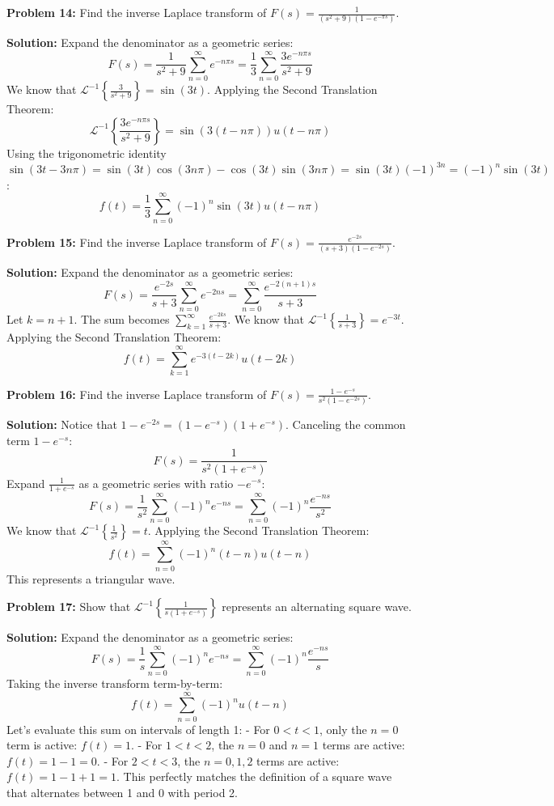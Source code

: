 \documentclass[11pt, letterpaper]{article}
\theoremstyle{definition}
\theoremstyle{remark}
\begin{document}
\vspace{1em}
\textbf{Problem 14:} Find the inverse Laplace transform of $F(s) = \frac{1}{(s^2 + 9)(1 - e^{-\pi s})}$.

\textbf{Solution:}
Expand the denominator as a geometric series:
\[ F(s) = \frac{1}{s^2 + 9} \sum_{n=0}^\infty e^{-n\pi s} = \frac{1}{3} \sum_{n=0}^\infty \frac{3 e^{-n\pi s}}{s^2 + 9} \]
We know that $\mathcal{L}^{-1} \left\{ \frac{3}{s^2 + 9} \right\} = \sin(3t)$. Applying the Second Translation Theorem:
\[ \mathcal{L}^{-1} \left\{ \frac{3 e^{-n\pi s}}{s^2 + 9} \right\} = \sin(3(t - n\pi)) u(t - n\pi) \]
Using the trigonometric identity $\sin(3t - 3n\pi) = \sin(3t)\cos(3n\pi) - \cos(3t)\sin(3n\pi) = \sin(3t)(-1)^{3n} = (-1)^n \sin(3t)$:
\[ f(t) = \frac{1}{3} \sum_{n=0}^\infty (-1)^n \sin(3t) u(t - n\pi) \]

\vspace{1em}
\textbf{Problem 15:} Find the inverse Laplace transform of $F(s) = \frac{e^{-2s}}{(s + 3)(1 - e^{-2s})}$.

\textbf{Solution:}
Expand the denominator as a geometric series:
\[ F(s) = \frac{e^{-2s}}{s + 3} \sum_{n=0}^\infty e^{-2ns} = \sum_{n=0}^\infty \frac{e^{-2(n+1)s}}{s + 3} \]
Let $k = n + 1$. The sum becomes $\sum_{k=1}^\infty \frac{e^{-2ks}}{s + 3}$.
We know that $\mathcal{L}^{-1} \left\{ \frac{1}{s + 3} \right\} = e^{-3t}$. Applying the Second Translation Theorem:
\[ f(t) = \sum_{k=1}^\infty e^{-3(t - 2k)} u(t - 2k) \]

\vspace{1em}
\textbf{Problem 16:} Find the inverse Laplace transform of $F(s) = \frac{1 - e^{-s}}{s^2(1 - e^{-2s})}$.

\textbf{Solution:}
Notice that $1 - e^{-2s} = (1 - e^{-s})(1 + e^{-s})$. Canceling the common term $1 - e^{-s}$:
\[ F(s) = \frac{1}{s^2(1 + e^{-s})} \]
Expand $\frac{1}{1 + e^{-s}}$ as a geometric series with ratio $-e^{-s}$:
\[ F(s) = \frac{1}{s^2} \sum_{n=0}^\infty (-1)^n e^{-ns} = \sum_{n=0}^\infty (-1)^n \frac{e^{-ns}}{s^2} \]
We know that $\mathcal{L}^{-1} \left\{ \frac{1}{s^2} \right\} = t$. Applying the Second Translation Theorem:
\[ f(t) = \sum_{n=0}^\infty (-1)^n (t - n) u(t - n) \]
This represents a triangular wave.

\vspace{1em}
\textbf{Problem 17:} Show that $\mathcal{L}^{-1} \left\{ \frac{1}{s(1 + e^{-s})} \right\}$ represents an alternating square wave.

\textbf{Solution:}
Expand the denominator as a geometric series:
\[ F(s) = \frac{1}{s} \sum_{n=0}^\infty (-1)^n e^{-ns} = \sum_{n=0}^\infty (-1)^n \frac{e^{-ns}}{s} \]
Taking the inverse transform term-by-term:
\[ f(t) = \sum_{n=0}^\infty (-1)^n u(t - n) \]
Let's evaluate this sum on intervals of length 1:
- For $0 < t < 1$, only the $n = 0$ term is active: $f(t) = 1$.
- For $1 < t < 2$, the $n = 0$ and $n = 1$ terms are active: $f(t) = 1 - 1 = 0$.
- For $2 < t < 3$, the $n = 0, 1, 2$ terms are active: $f(t) = 1 - 1 + 1 = 1$.
This perfectly matches the definition of a square wave that alternates between 1 and 0 with period 2.
\end{document}
